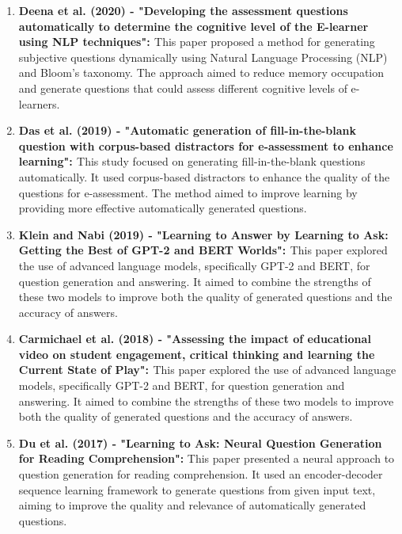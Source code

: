 \begin{enumerate}
\item \textbf{Deena et al. (2020) - "Developing the assessment questions automatically to determine the cognitive level of the E-learner using NLP techniques": \cite{deena2020developing}} 
This paper proposed a method for generating subjective questions dynamically using Natural Language Processing (NLP) and Bloom's taxonomy. The approach aimed to reduce memory occupation and generate questions that could assess different cognitive levels of e-learners.

\item \textbf{Das et al. (2019) - "Automatic generation of fill-in-the-blank question with corpus-based distractors for e-assessment to enhance learning": \cite{das2019automatic}} 
This study focused on generating fill-in-the-blank questions automatically. It used corpus-based distractors to enhance the quality of the questions for e-assessment. The method aimed to improve learning by providing more effective automatically generated questions.


\item \textbf{Klein and Nabi (2019) - "Learning to Answer by Learning to Ask: Getting the Best of GPT-2 and BERT Worlds": \cite{klein2019learning}} 
This paper explored the use of advanced language models, specifically GPT-2 and BERT, for question generation and answering. It aimed to combine the strengths of these two models to improve both the quality of generated questions and the accuracy of answers.

\newpage
\item \textbf{Carmichael et al. (2018) - "Assessing the impact of educational video on student engagement, critical thinking and learning the Current State of Play":
\cite{carmichael2018assessing}} 
This paper explored the use of advanced language models, specifically GPT-2 and BERT, for question generation and answering. It aimed to combine the strengths of these two models to improve both the quality of generated questions and the accuracy of answers.

\item \textbf{Du et al. (2017) - "Learning to Ask: Neural Question Generation for Reading Comprehension":\cite{du2017learning}} 
This paper presented a neural approach to question generation for reading comprehension. It used an encoder-decoder sequence learning framework to generate questions from given input text, aiming to improve the quality and relevance of automatically generated questions.


\end{enumerate}

